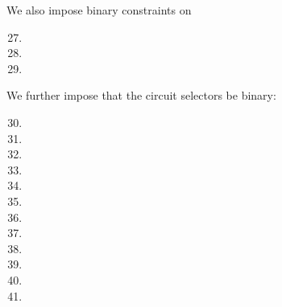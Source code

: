 \noindent We also impose binary constraints on
\begin{multicols}{2}
    \begin{enumerate}
        \setcounter{enumi}{26}
        \item \isFirstInput
        \item \isSecondInput
        \item \wcpFlag
    \end{enumerate} 
\end{multicols}
\noindent We further impose that the circuit selectors be binary:
\begin{multicols}{2}
    \begin{enumerate}
        \setcounter{enumi}{29}
        \item \csPointEvaluation
        \item \csCOne
        \item \csGOne
        \item \csCTwo
        \item \csGTwo
        \item \csPairing
        \item \csGOneAdd
        \item \csGTwoAdd
        \item \csGOneMsm
        \item \csGTwoMsm
        \item \csMapFpToGOne 
        \item \csMapFpTwoToGTwo
    \end{enumerate}
\end{multicols}
